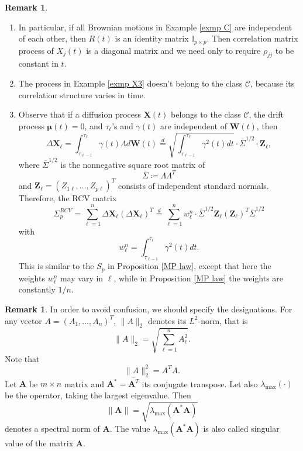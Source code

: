 \documentclass[a4paper,11pt]{book}
\theoremstyle{plain}
\theoremstyle{definition}
\newtheorem{rmrk}[thm]{Remark}
\begin{document}
    \begin{rmrk} \
    	\begin{enumerate}
    		\item In particular, if all Brownian motions in Example \ref{exmp C} are independent of each other, then $R(t)$ is an identity matrix $\mathbb{I}_{p \times p}$. Then correlation matrix process of $X_j(t)$ is a diagonal matrix and we need only to require $\rho_{jj}$ to be constant in $t$. 
    		\item The process in Example \ref{exmp X3} doesn't belong to the class $\mathcal{C}$, because its correlation structure varies in time.
    		\item Observe that if a diffusion process $\mathbf{X}(t)$ belongs to the class $\mathcal{C}$, the drift process $\boldsymbol{\mu}(t) = 0$, and $\tau_\ell$'s and $\gamma(t)$ are independent of $\mathbf{W}(t)$, then
    		\[ \Delta \mathbf{X}_\ell = \int_{\tau_{\ell-1}}^{\tau_\ell} \gamma(t) \Lambda d\mathbf{W}(t) \stackrel{d}{=} \sqrt{\int_{\tau_{\ell-1}}^{\tau_\ell} \gamma^2(t)dt} \cdot \overline{\Sigma}^{1/2} \cdot \mathbf{Z}_\ell, \]
    		where $ \overline{\Sigma}^{1/2}$ is the nonnegative square root matrix of
    		\[\overline{\Sigma} \coloneqq \Lambda \Lambda^T \]
    		and $\mathbf{Z}_\ell = (Z_{1\ell}, \dots, Z_{p\ell})^T$ consists of independent standard normals. Therefore, the RCV matrix
    		\[ \Sigma_p^{RCV} = \sum_{\ell=1}^{n} \Delta \mathbf{X}_\ell(\Delta \mathbf{X}_\ell)^T \stackrel{d}{=} \sum_{\ell=1}^{n} w_\ell^n \cdot \overline{\Sigma}^{1/2}\mathbf{Z}_\ell (\mathbf{Z}_\ell)^T \overline{\Sigma}^{1/2} \]
    		with 
    		\[w_\ell^n =\int_{\tau_{\ell-1}}^{\tau_\ell} \gamma^2(t)dt.\]
    		This is similar to the $S_p$ in Proposition \ref{MP law}, except that here the weights $w_\ell^n$ may vary in $\ell$, while in Proposition \ref{MP law} the weights are constantly $1/n$.
    	\end{enumerate}
    \end{rmrk}
    
    \begin{rmrk}
    	In order to avoid confusion, we should specify the designations. For any vector $A = (A_1, \dots, A_n)^T$, $\|A\|_2$ denotes its $L^2$-norm, that is
    	\[ \|A\|_2 = \sqrt{\sum_{\ell=1}^n A_\ell^2 }. \]
    	Note that
    	\[ \|A\|_2^2 = A^T A. \]
    	Let $\mathbf{A}$ be $m \times n$ matrix and $\mathbf{A}^* = \overline{\mathbf{A}^T}$ its conjugate transpose. Let also $\lambda_{\max}(\cdot)$ be the operator, taking the largest eigenvalue. Then
    	\[ \|\mathbf{A} \| = \sqrt{\lambda_{\max} (\mathbf{A}^* \mathbf{A}) } \]
    	denotes a spectral norm of $\mathbf{A}$. The value $\lambda_{\max} (\mathbf{A}^* \mathbf{A})$ is also called singular value of the matrix $\mathbf{A}$.
    \end{rmrk}
    
\end{document}

